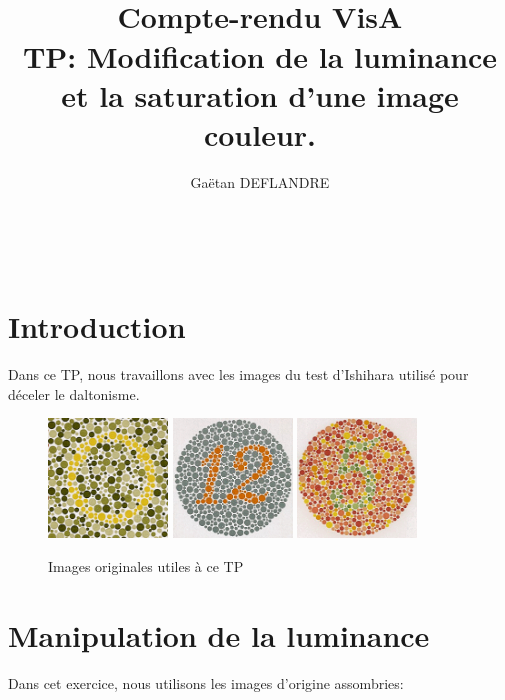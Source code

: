 \documentclass[a4paper,11pt]{article}
\title{
  \noindent\hrulefill \\
  \vspace{10mm}
  \textbf{Compte-rendu VisA} \\
  \vspace{5mm}
  TP: Modification de la luminance et la saturation d'une image couleur.
}
\author{Gaëtan DEFLANDRE}
\begin{document}
\maketitle
\noindent\hrulefill \\


\section*{Introduction}


\newpage

Dans ce TP, nous travaillons avec les images du test d'Ishihara utilisé 
pour déceler le daltonisme.

\begin{figure}[H]
  \begin{center}
    \includegraphics[width=120px]{images/it1_72pp.png}
    \includegraphics[width=120px]{images/it2_72pp.png}
    \includegraphics[width=120px]{images/it3_72pp.png}
    \caption{Images originales utiles à ce TP}
  \end{center}
\end{figure}

\section{Manipulation de la luminance}

Dans cet exercice, nous utilisons les images d'origine assombries:
\end{document}
